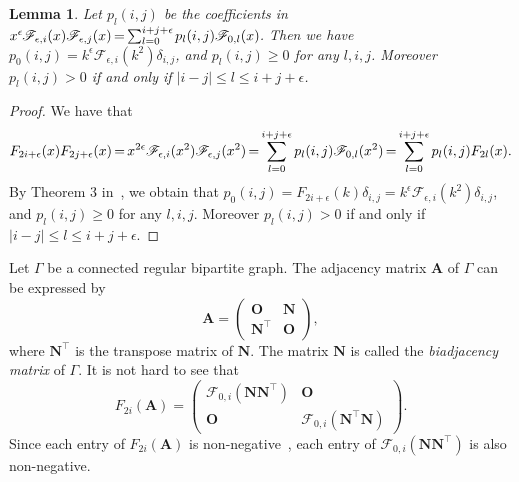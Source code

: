 \documentclass[10pt]{amsart}
\newtheorem{lemm}[theo]{Lemma}
\providecommand{\bA}{\boldsymbol{A}}
\newcommand*{\mk}{\mkern -1mu}
\newcommand*{\Mk}{\mkern -2mu}
\begin{document}
\begin{lemm} \label{lem:coe}
Let $p_l(i,j)$ be the coefficients in 
$x^{\epsilon} \mk \mathscr{F}_{\epsilon,i}(x)\mathscr{F}_{\epsilon,j}(x)\Mk =\Mk \sum_{l=0}^{i+j+\epsilon}\mk p_l(i,j)
\mathscr{F}_{0,l}(x)\mk $. Then
we have 
$p_0(i,j)=
k^{\epsilon}\mathscr{F}_{\epsilon,i}(k^2)\delta_{i,j}$, and 
$p_l(i,j)\geq 0$ for any $l,i,j$. Moreover 
$p_l(i,j)>0$ if and only if $|i-j|\leq l \leq i+j+\epsilon$. 
\end{lemm}
\begin{proof}
We have that
\[
F_{2i+\epsilon}(x)F_{2j+\epsilon}(x)\Mk =\Mk 
x^{2\epsilon}\mathscr{F}_{\epsilon,i}(x^2)\mathscr{F}_{\epsilon,j}(x^2)
\Mk =\Mk 
\sum_{l=0}^{i+j+\epsilon}p_l(i,j)
\mathscr{F}_{0,l}(x^2)
\Mk =\Mk 
\sum_{l=0}^{i+j+\epsilon}p_l(i,j)F_{2l}(x).
\]
By Theorem 3 in~\cite{N}, we obtain that 
$p_0(i,j)=F_{2i+\epsilon}(k) \delta_{i,j}=
k^{\epsilon}\mathscr{F}_{\epsilon,i}(k^2)\delta_{i,j}$, and 
$p_l(i,j)\geq 0$ for any $l,i,j$. Moreover 
$p_l(i,j)>0$ if and only if $|i-j|\leq l \leq i+j+\epsilon$. 
\end{proof}
Let $\Gamma$ be a connected regular bipartite graph. 
The adjacency matrix $\bA$ of $\Gamma$ can be expressed by 
\[
\boldsymbol{A}=
\begin{pmatrix}
\boldsymbol{O} & \boldsymbol{N}\\
\boldsymbol{N}^{\top} & \boldsymbol{O} 
\end{pmatrix}, 
\]
where $\boldsymbol{N}^{\top}$ is the transpose matrix of $\boldsymbol{N}$. 
The matrix $\boldsymbol{N}$ is called the \emph{biadjacency matrix} of $\Gamma$. 
It is not hard to see that 
\begin{equation} \label{eq:AB}
F_{2i}(\boldsymbol{A})= 
\begin{pmatrix}
\mathscr{F}_{0,i}(\boldsymbol{N}\boldsymbol{N}^{\top}) & \boldsymbol{O} \\
\boldsymbol{O} & \mathscr{F}_{0,i}(\boldsymbol{N}^{\top} \boldsymbol{N})
\end{pmatrix}. 
\end{equation}
Since each entry of $F_{2i}(\boldsymbol{A})$ is non-negative~\cite{S66}, 
each entry of $\mathscr{F}_{0,i}(\boldsymbol{N}\boldsymbol{N}^{\top})$ is also non-negative. 
\end{document}
